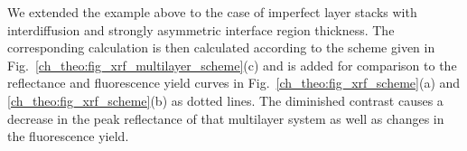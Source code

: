 We extended the example above to the case of imperfect layer stacks with interdiffusion and strongly asymmetric interface region thickness. The corresponding calculation is then calculated according to the scheme given in Fig.~\ref{ch_theo:fig_xrf_multilayer_scheme}(c) and is added for comparison to the reflectance and fluorescence yield curves in Fig.~\ref{ch_theo:fig_xrf_scheme}(a) and \ref{ch_theo:fig_xrf_scheme}(b) as dotted lines. The diminished contrast causes a decrease in the peak reflectance of that multilayer system as well as changes in the fluorescence yield.



